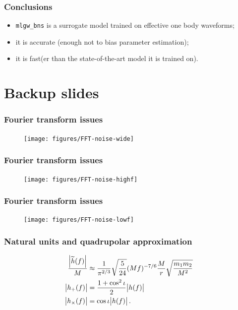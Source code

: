 \documentclass{beamer}
\begin{document}
\begin{frame}
    \frametitle{Conclusions}
    \begin{itemize}
        \item \texttt{mlgw\_bns} is a surrogate model trained on effective one body waveforms;
        \item it is accurate (enough not to bias parameter estimation);
        \item it is fast(er than the state-of-the-art model it is trained on).
    \end{itemize}
\end{frame}

\section{Backup slides}

\begin{frame}
    \frametitle{Fourier transform issues}
    
    \begin{figure}[ht]
    \centering
    \texttt{[image: figures/FFT-noise-wide]}
    \label{fig:fft-noise-wide}
    \end{figure}
\end{frame}

\begin{frame}
    \frametitle{Fourier transform issues}
    \begin{figure}[ht]
    \centering
    \texttt{[image: figures/FFT-noise-highf]}
    \label{fig:fft-noise-highf}
    \end{figure}
\end{frame}

\begin{frame}
    \frametitle{Fourier transform issues}
    \begin{figure}[ht]
    \centering
    \texttt{[image: figures/FFT-noise-lowf]}
    \label{fig:fft-noise-lowf}
    \end{figure}
\end{frame}

\begin{frame}
    \frametitle{Natural units and quadrupolar approximation}
    \begin{align}
    \frac{\abs{\widetilde{h}(f)}}{M} &\approx \frac{1}{\pi^{2/3}} \sqrt{\frac{5}{24}} (Mf)^{-7/6} \frac{M}{r} \sqrt{\frac{m_1 m_2 }{M^2}} \\
    \abs{h_{+}(f)} &= \frac{1 + \cos^2 \iota }{2} \abs{h (f)} \\
    \abs{h_{ \times }(f)} &= \cos \iota  \abs{h (f)}
    \,.
    \end{align}
\end{frame}
\end{document}
